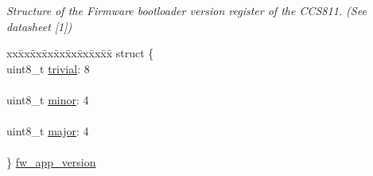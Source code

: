 \begin{DoxyCompactItemize}
\begin{tabbing}
\end{tabbing}\begin{DoxyCompactList}\small\item\em Structure of the Firmware bootloader version register of the C\+C\+S811. (See datasheet \mbox{[}1\mbox{]}) \end{DoxyCompactList}\item 
\begin{tabbing}
xx\=xx\=xx\=xx\=xx\=xx\=xx\=xx\=xx\=\kill
struct \{\\
\>uint8\_t \mbox{\hyperlink{union_application_register_a3b0d741a372e96fc6dd2cb18095e868c}{trivial}}: 8\\
\>\\
\>uint8\_t \mbox{\hyperlink{union_application_register_ae2f416b0a34b7beb4ed3873d791ac393}{minor}}: 4\\
\>\\
\>uint8\_t \mbox{\hyperlink{union_application_register_a5bd4e4c943762926c8f653b6224cced2}{major}}: 4\\
\>\\
\} \mbox{\hyperlink{union_application_register_aa0aac4d3d600c35642cf00e4953d143f}{fw\_app\_version}}\\


\end{tabbing}
\end{DoxyCompactItemize}
